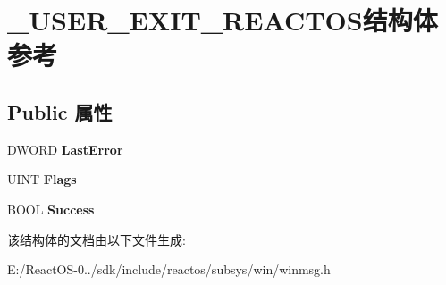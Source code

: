\hypertarget{struct___u_s_e_r___e_x_i_t___r_e_a_c_t_o_s}{}\section{\+\_\+\+U\+S\+E\+R\+\_\+\+E\+X\+I\+T\+\_\+\+R\+E\+A\+C\+T\+O\+S结构体 参考}
\label{struct___u_s_e_r___e_x_i_t___r_e_a_c_t_o_s}
\subsection*{Public 属性}
\begin{DoxyCompactItemize}
\item 
\mbox{\label{struct___u_s_e_r___e_x_i_t___r_e_a_c_t_o_s_aa6acf2df0c344522b33a6bd81c0613a5}} 
D\+W\+O\+RD {\bfseries Last\+Error}
\item 
\mbox{\label{struct___u_s_e_r___e_x_i_t___r_e_a_c_t_o_s_a3205ca194575a4080f665a6f1e182ac2}} 
U\+I\+NT {\bfseries Flags}
\item 
\mbox{\label{struct___u_s_e_r___e_x_i_t___r_e_a_c_t_o_s_a5622129c4e169b61b476ac50e7a67ff3}} 
B\+O\+OL {\bfseries Success}
\end{DoxyCompactItemize}


该结构体的文档由以下文件生成\+:\begin{DoxyCompactItemize}
\item 
E\+:/\+React\+O\+S-\/0../sdk/include/reactos/subsys/win/winmsg.\+h\end{DoxyCompactItemize}
